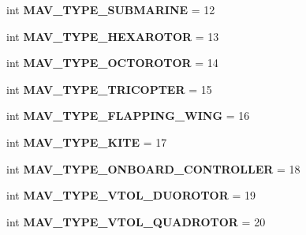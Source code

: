 \begin{DoxyCompactItemize}
int {\bfseries M\+A\+V\+\_\+\+T\+Y\+P\+E\+\_\+\+S\+U\+B\+M\+A\+R\+I\+NE} = 12
\item 
\mbox{\label{namespacepymavlink_1_1dialects_1_1v10_aaf1302582866710ead100ec064625218}} 
int {\bfseries M\+A\+V\+\_\+\+T\+Y\+P\+E\+\_\+\+H\+E\+X\+A\+R\+O\+T\+OR} = 13
\item 
\mbox{\label{namespacepymavlink_1_1dialects_1_1v10_ae6b631f7d070cf5764819e12f3765810}} 
int {\bfseries M\+A\+V\+\_\+\+T\+Y\+P\+E\+\_\+\+O\+C\+T\+O\+R\+O\+T\+OR} = 14
\item 
\mbox{\label{namespacepymavlink_1_1dialects_1_1v10_a422e63a150786b7739b93a062ca64b02}} 
int {\bfseries M\+A\+V\+\_\+\+T\+Y\+P\+E\+\_\+\+T\+R\+I\+C\+O\+P\+T\+ER} = 15
\item 
\mbox{\label{namespacepymavlink_1_1dialects_1_1v10_a03f187b34c423b6f1d3362e68e9e0b15}} 
int {\bfseries M\+A\+V\+\_\+\+T\+Y\+P\+E\+\_\+\+F\+L\+A\+P\+P\+I\+N\+G\+\_\+\+W\+I\+NG} = 16
\item 
\mbox{\label{namespacepymavlink_1_1dialects_1_1v10_ad2f1cddc48d523beb39090f6203a5d00}} 
int {\bfseries M\+A\+V\+\_\+\+T\+Y\+P\+E\+\_\+\+K\+I\+TE} = 17
\item 
\mbox{\label{namespacepymavlink_1_1dialects_1_1v10_a713e5c022e63a9da238dd6d0bac2703b}} 
int {\bfseries M\+A\+V\+\_\+\+T\+Y\+P\+E\+\_\+\+O\+N\+B\+O\+A\+R\+D\+\_\+\+C\+O\+N\+T\+R\+O\+L\+L\+ER} = 18
\item 
\mbox{\label{namespacepymavlink_1_1dialects_1_1v10_af294cadccbae73ed39691079c23d5b2a}} 
int {\bfseries M\+A\+V\+\_\+\+T\+Y\+P\+E\+\_\+\+V\+T\+O\+L\+\_\+\+D\+U\+O\+R\+O\+T\+OR} = 19
\item 
\mbox{\label{namespacepymavlink_1_1dialects_1_1v10_a228ce99d445f4391360936bfc9756304}} 
int {\bfseries M\+A\+V\+\_\+\+T\+Y\+P\+E\+\_\+\+V\+T\+O\+L\+\_\+\+Q\+U\+A\+D\+R\+O\+T\+OR} = 20
\item 
\mbox{\label{namespacepymavlink_1_1dialects_1_1v10_a759c159b9ce92d25d7ee6185f3496acc}} 

\end{DoxyCompactItemize}

